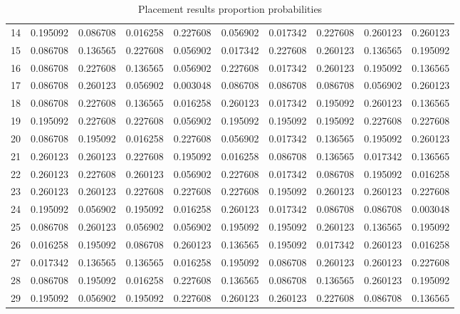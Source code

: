 \begin{table}
\begin{tabular}{lrrrrrrrrr}
14 &      0.195092 &  0.086708 &  0.016258 &  0.227608 &  0.056902 &  0.017342 &    0.227608 &  0.260123 &  0.260123 \\
15 &      0.086708 &  0.136565 &  0.227608 &  0.056902 &  0.017342 &  0.227608 &    0.260123 &  0.136565 &  0.195092 \\
16 &      0.086708 &  0.227608 &  0.136565 &  0.056902 &  0.227608 &  0.017342 &    0.260123 &  0.195092 &  0.136565 \\
17 &      0.086708 &  0.260123 &  0.056902 &  0.003048 &  0.086708 &  0.086708 &    0.086708 &  0.056902 &  0.260123 \\
18 &      0.086708 &  0.227608 &  0.136565 &  0.016258 &  0.260123 &  0.017342 &    0.195092 &  0.260123 &  0.136565 \\
19 &      0.195092 &  0.227608 &  0.227608 &  0.056902 &  0.195092 &  0.195092 &    0.195092 &  0.227608 &  0.227608 \\
20 &      0.086708 &  0.195092 &  0.016258 &  0.227608 &  0.056902 &  0.017342 &    0.136565 &  0.195092 &  0.260123 \\
21 &      0.260123 &  0.260123 &  0.227608 &  0.195092 &  0.016258 &  0.086708 &    0.136565 &  0.017342 &  0.136565 \\
22 &      0.260123 &  0.227608 &  0.260123 &  0.056902 &  0.227608 &  0.017342 &    0.086708 &  0.195092 &  0.016258 \\
23 &      0.260123 &  0.260123 &  0.227608 &  0.227608 &  0.227608 &  0.195092 &    0.260123 &  0.260123 &  0.227608 \\
24 &      0.195092 &  0.056902 &  0.195092 &  0.016258 &  0.260123 &  0.017342 &    0.086708 &  0.086708 &  0.003048 \\
25 &      0.086708 &  0.260123 &  0.056902 &  0.056902 &  0.195092 &  0.195092 &    0.260123 &  0.136565 &  0.195092 \\
26 &      0.016258 &  0.195092 &  0.086708 &  0.260123 &  0.136565 &  0.195092 &    0.017342 &  0.260123 &  0.016258 \\
27 &      0.017342 &  0.136565 &  0.136565 &  0.016258 &  0.195092 &  0.086708 &    0.260123 &  0.260123 &  0.227608 \\
28 &      0.086708 &  0.195092 &  0.016258 &  0.227608 &  0.136565 &  0.086708 &    0.136565 &  0.260123 &  0.195092 \\
29 &      0.195092 &  0.056902 &  0.195092 &  0.227608 &  0.260123 &  0.260123 &    0.227608 &  0.086708 &  0.136565 \\
\bottomrule
\end{tabular}
\caption{Placement results proportion probabilities}
\end{table}

